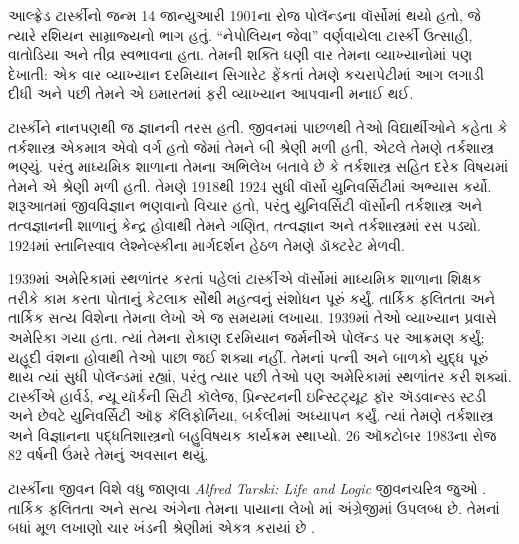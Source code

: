 \begingroup
\makeatletter{}\makeatother


\label{guunit:OLP-0630}



આલ્ફ્રેડ ટાર્સ્કીનો જન્મ 14 જાન્યુઆરી
1901ના રોજ પોલૅન્ડના વૉર્સોમાં થયો હતો,
જે ત્યારે રશિયન સામ્રાજ્યનો ભાગ હતું.
“નેપોલિયન જેવા” વર્ણવાયેલા ટાર્સ્કી
ઉત્સાહી, વાતોડિયા અને તીવ્ર સ્વભાવના
હતા. તેમની શક્તિ ઘણી વાર તેમના
વ્યાખ્યાનોમાં પણ દેખાતી: એક વાર
વ્યાખ્યાન દરમિયાન સિગારેટ ફેંકતાં
તેમણે કચરાપેટીમાં આગ લગાડી દીધી
અને પછી તેમને એ ઇમારતમાં
ફરી વ્યાખ્યાન આપવાની મનાઈ થઈ.

ટાર્સ્કીને નાનપણથી જ જ્ઞાનની
તરસ હતી. જીવનમાં પાછળથી
તેઓ વિદ્યાર્થીઓને કહેતા કે
તર્કશાસ્ત્ર એકમાત્ર એવો વર્ગ
હતો જેમાં તેમને બી શ્રેણી
મળી હતી, એટલે તેમણે
તર્કશાસ્ત્ર ભણ્યું. પરંતુ
માધ્યમિક શાળાના તેમના
અભિલેખ બતાવે છે કે
તર્કશાસ્ત્ર સહિત દરેક
વિષયમાં તેમને એ શ્રેણી
મળી હતી. તેમણે 1918થી
1924 સુધી વૉર્સો
યુનિવર્સિટીમાં અભ્યાસ
કર્યો. શરૂઆતમાં જીવવિજ્ઞાન
ભણવાનો વિચાર હતો, પરંતુ
યુનિવર્સિટી વૉર્સોની
તર્કશાસ્ત્ર અને તત્વજ્ઞાનની
શાળાનું કેન્દ્ર હોવાથી
તેમને ગણિત, તત્વજ્ઞાન અને
તર્કશાસ્ત્રમાં રસ પડ્યો.
1924માં સ્તાનિસ્વાવ
લેશ્નેવ્સ્કીના માર્ગદર્શન
હેઠળ તેમણે ડૉક્ટરેટ મેળવી.

1939માં અમેરિકામાં સ્થળાંતર
કરતાં પહેલાં ટાર્સ્કીએ
વૉર્સોમાં માધ્યમિક શાળાના
શિક્ષક તરીકે કામ કરતા
પોતાનું કેટલાક સૌથી મહત્વનું
સંશોધન પૂરું કર્યું.
તાર્કિક ફલિતતા અને
તાર્કિક સત્ય વિશેના
તેમના લેખો એ જ સમયમાં
લખાયા. 1939માં તેઓ
વ્યાખ્યાન પ્રવાસે
અમેરિકા ગયા હતા. ત્યાં
તેમના રોકાણ દરમિયાન
જર્મનીએ પોલૅન્ડ પર
આક્રમણ કર્યું; યહૂદી
વંશના હોવાથી તેઓ
પાછા જઈ શક્યા નહીં.
તેમનાં પત્ની અને
બાળકો યુદ્ધ પૂરું થાય
ત્યાં સુધી પોલૅન્ડમાં
રહ્યાં, પરંતુ ત્યાર
પછી તેઓ પણ અમેરિકામાં
સ્થળાંતર કરી શક્યાં.
ટાર્સ્કીએ હાર્વર્ડ,
ન્યૂ યૉર્કની સિટી
કૉલેજ, પ્રિન્સ્ટનની
ઇન્સ્ટિટ્યૂટ ફૉર
ઍડવાન્સ્ડ સ્ટડી
અને છેવટે યુનિવર્સિટી
ઑફ કૅલિફોર્નિયા,
બર્કલીમાં અધ્યાપન
કર્યું. ત્યાં તેમણે
તર્કશાસ્ત્ર અને વિજ્ઞાનના
પદ્ધતિશાસ્ત્રનો બહુવિષયક
કાર્યક્રમ સ્થાપ્યો.
26 ઑક્ટોબર 1983ના
રોજ 82 વર્ષની
ઉંમરે તેમનું અવસાન
થયું.

\begin{reading} 
ટાર્સ્કીના જીવન
વિશે વધુ જાણવા
\emph{Alfred Tarski: Life
  and Logic}
જીવનચરિત્ર જુઓ
\citep{Feferman2004}.
તાર્કિક ફલિતતા અને
સત્ય અંગેના તેમના
પાયાના લેખો
\citep{Tarski1983}માં
અંગ્રેજીમાં ઉપલબ્ધ
છે. તેમનાં બધાં
મૂળ લખાણો ચાર
ખંડની શ્રેણીમાં
એકત્ર કરાયાં છે
\citep{Tarski1981}.
\end{reading}
\endgroup


